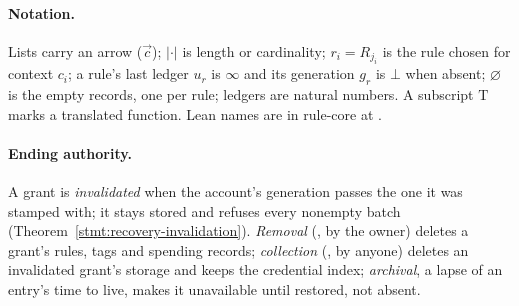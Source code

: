 \paragraph{Notation.} Lists carry an arrow ($\vec c$); $|\cdot|$ is length or
cardinality; $r_i = R_{j_i}$ is the rule chosen for context $c_i$; a rule's last
ledger $u_r$ is $\infty$ and its generation $g_r$ is $\bot$ when absent;
$\varnothing$ is the empty records, one per rule; ledgers are natural numbers. A
subscript $\mathrm{T}$ marks a translated function. Lean names are in rule-core
at .



\paragraph{Ending authority.} A grant is \emph{invalidated} when the account's
generation passes the one it was stamped with; it stays stored and refuses every
nonempty batch (Theorem~\ref{stmt:recovery-invalidation}). \emph{Removal}
(, by the owner) deletes a grant's rules, tags and spending
records; \emph{collection} (, by anyone) deletes an invalidated
grant's storage and keeps the credential index; \emph{archival}, a lapse of an
entry's time to live, makes it unavailable until restored, not absent.
